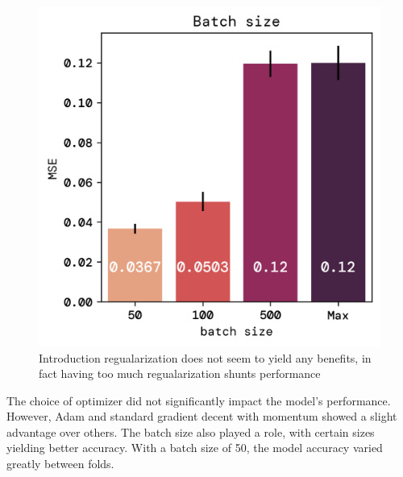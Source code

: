 \documentclass[twoside,11pt]{report}
\begin{document}
\begin{figure}[!ht]
\begin{minipage}[t]{0.5\textwidth - 1mm}
        \end{minipage}
        \hspace{2mm}
        \begin{minipage}[t]{0.5\textwidth - 1mm}
            \begin{center}
                \includegraphics[width=\textwidth]{../runsAndFigures/MSE_batch.png}
            \end{center}
            \caption{Introduction regualarization does not seem to yield any benefits, in fact
            having too much regualarization shunts performance}\label{fig:MSE_batch}
        \end{minipage}
    \end{figure}

    \noindent
    The choice of optimizer did not significantly impact the model's performance. However, 
    Adam and standard gradient decent with momentum showed a slight advantage over others. 
    The batch size also played a role, with certain sizes yielding better accuracy. With a batch size of 50,
    the model accuracy varied greatly between folds.
\end{document}
